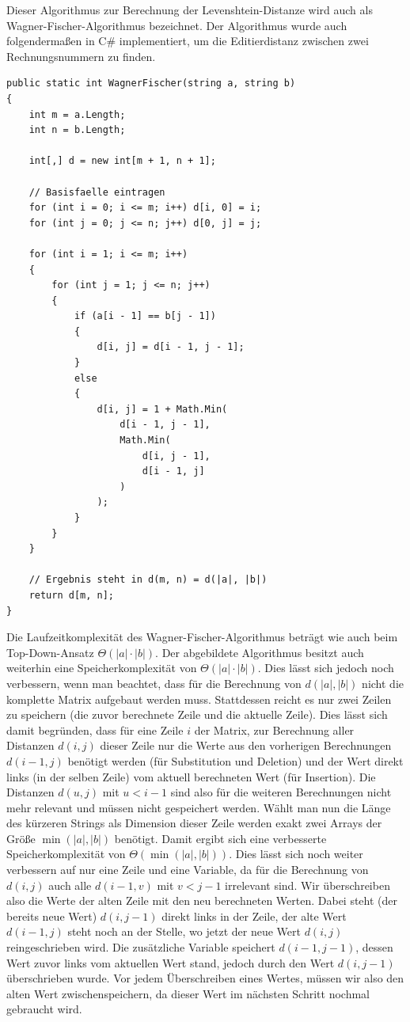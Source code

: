 \documentclass{whswinvcbook}
\begin{document}
Dieser Algorithmus zur Berechnung der Levenshtein-Distanze wird auch als Wagner-Fischer-Algorithmus bezeichnet. Der Algorithmus wurde auch folgendermaßen in C\# implementiert, um die Editierdistanz zwischen zwei Rechnungsnummern zu finden.
\begin{lstlisting}[caption=Wagner-Fischer-Algorithmus, label=lst:wagner_fischer]
public static int WagnerFischer(string a, string b)
{
    int m = a.Length;
    int n = b.Length;

    int[,] d = new int[m + 1, n + 1];

    // Basisfaelle eintragen
    for (int i = 0; i <= m; i++) d[i, 0] = i;
    for (int j = 0; j <= n; j++) d[0, j] = j;

    for (int i = 1; i <= m; i++)
    {
        for (int j = 1; j <= n; j++)
        {
            if (a[i - 1] == b[j - 1])
            {
                d[i, j] = d[i - 1, j - 1];
            }
            else
            {
                d[i, j] = 1 + Math.Min(
                    d[i - 1, j - 1],
                    Math.Min(
                        d[i, j - 1],
                        d[i - 1, j]
                    )
                );
            }
        }
    }

    // Ergebnis steht in d(m, n) = d(|a|, |b|)
    return d[m, n];
}
\end{lstlisting}
Die Laufzeitkomplexität des Wagner-Fischer-Algorithmus beträgt wie auch beim Top-Down-Ansatz $\Theta(|a|\cdot|b|)$. Der abgebildete Algorithmus besitzt auch weiterhin eine Speicherkomplexität von $\Theta(|a|\cdot|b|)$. Dies lässt sich jedoch noch verbessern, wenn man beachtet, dass für die Berechnung von $d(|a|,|b|)$ nicht die komplette Matrix aufgebaut werden muss. Stattdessen reicht es nur zwei Zeilen zu speichern (die zuvor berechnete Zeile und die aktuelle Zeile). Dies lässt sich damit begründen, dass für eine Zeile $i$ der Matrix, zur Berechnung aller Distanzen $d(i,j)$ dieser Zeile nur die Werte aus den vorherigen Berechnungen $d(i-1,j)$ benötigt werden (für Substitution und Deletion) und der Wert direkt links (in der selben Zeile) vom aktuell berechneten Wert (für Insertion). Die Distanzen $d(u,j)$ mit $u<i-1$ sind also für die weiteren Berechnungen nicht mehr relevant und müssen nicht gespeichert werden. Wählt man nun die Länge des kürzeren Strings als Dimension dieser Zeile werden exakt zwei Arrays der Größe $\min(|a|,|b|)$ benötigt. Damit ergibt sich eine verbesserte Speicherkomplexität von $\Theta(\min(|a|,|b|))$. Dies lässt sich noch weiter verbessern auf nur eine Zeile und eine Variable, da für die Berechnung von $d(i,j)$ auch alle $d(i-1,v)$ mit $v<j-1$ irrelevant sind. Wir überschreiben also die Werte der alten Zeile mit den neu berechneten Werten. Dabei steht (der bereits neue Wert) $d(i,j-1)$ direkt links in der Zeile, der alte Wert $d(i-1,j)$ steht noch an der Stelle, wo jetzt der neue Wert $d(i,j)$ reingeschrieben wird. Die zusätzliche Variable speichert $d(i-1,j-1)$, dessen Wert zuvor links vom aktuellen Wert stand, jedoch durch den Wert $d(i,j-1)$ überschrieben wurde. Vor jedem Überschreiben eines Wertes, müssen wir also den alten Wert zwischenspeichern, da dieser Wert im nächsten Schritt nochmal gebraucht wird.
\end{document}
